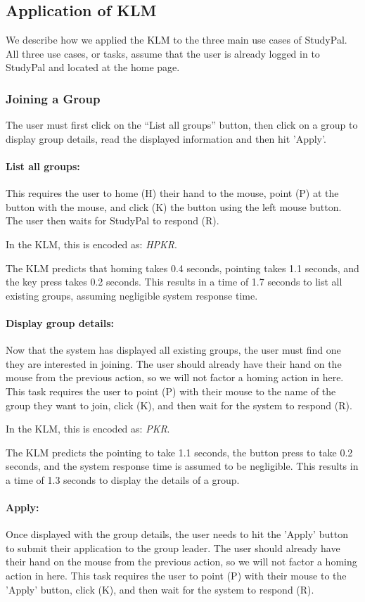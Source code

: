 \documentclass[conference]{IEEEtran}
\begin{document}
\subsection{Application of KLM}
We describe how we applied the KLM to the three main use cases of StudyPal.
All three use cases, or tasks, assume that the user is already logged in to StudyPal and located at the home page.

\subsubsection{Joining a Group}
The user must first click on the ``List all groups'' button, then click on a group to display group details, read the displayed information and then hit 'Apply'.

\paragraph{List all groups:}
This requires the user to home (H) their hand to the mouse, point (P) at the button with the mouse, and click (K) the button using the left mouse button.
The user then waits for StudyPal to respond (R).

In the KLM, this is encoded as: \emph{HPKR}.

The KLM predicts that homing takes 0.4 seconds, pointing takes 1.1 seconds, and the key press takes 0.2 seconds.
This results in a time of 1.7 seconds to list all existing groups, assuming negligible system response time.

\paragraph{Display group details:}
Now that the system has displayed all existing groups, the user must find one they are interested in joining.
The user should already have their hand on the mouse from the previous action, so we will not factor a homing action in here.
This task requires the user to point (P) with their mouse to the name of the group they want to join, click (K), and then wait for the system to respond (R).

In the KLM, this is encoded as: \emph{PKR}.

The KLM predicts the pointing to take 1.1 seconds, the button press to take 0.2 seconds, and the system response time is assumed to be negligible.
This results in a time of 1.3 seconds to display the details of a group.

\paragraph{Apply:}
Once displayed with the group details, the user needs to hit the 'Apply' button to submit their application to the group leader.
The user should already have their hand on the mouse from the previous action, so we will not factor a homing action in here.
This task requires the user to point (P) with their mouse to the 'Apply' button, click (K), and then wait for the system to respond (R).
\end{document}
